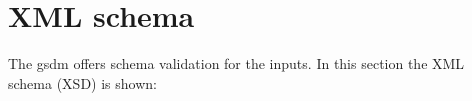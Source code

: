 \chapter{XML schema}\label{ap:xml_schema}

The \acrshort{gsdm} offers schema validation for the inputs. In this section the XML schema (XSD) is shown:


